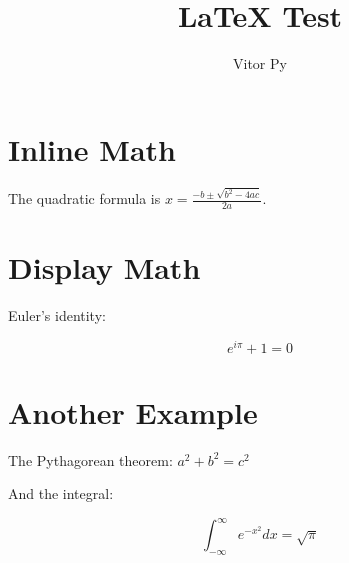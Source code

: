 \documentclass{article}
\title{LaTeX Test}
\author{Vitor Py}
\date{}
\begin{document}

\maketitle

\section{Inline Math}

The quadratic formula is $x = \frac{-b \pm \sqrt{b^2 - 4ac}}{2a}$.

\section{Display Math}

Euler's identity:

$$e^{i\pi} + 1 = 0$$

\section{Another Example}

The Pythagorean theorem: $a^2 + b^2 = c^2$

And the integral:

$$\int_{-\infty}^{\infty} e^{-x^2} dx = \sqrt{\pi}$$


\end{document}
